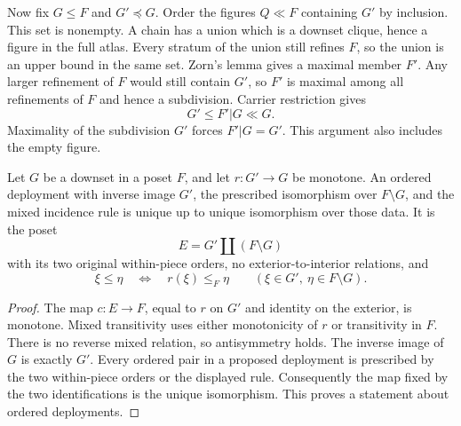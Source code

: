 Now fix $G\leq F$ and $G'\preceq G$.
Order the figures $Q\ll F$ containing $G'$ by inclusion.
This set is nonempty. A chain has a union which is a downset
clique, hence a figure in the full atlas. Every stratum of the
union still refines $F$, so the union is an upper bound in the
same set. Zorn's lemma gives a maximal member $F'$.
Any larger refinement of $F$ would still contain $G'$, so $F'$
is maximal among all refinements of $F$ and hence a subdivision.
Carrier restriction gives
\[
 G'\leq F'|G\ll G.
\]
Maximality of the subdivision $G'$ forces $F'|G=G'$.
This argument also includes the empty figure.

\begin{proposition}
\label{prop:deployment-uniqueness}
Let $G$ be a downset in a poset $F$, and let $r:G'\to G$
be monotone. An ordered deployment with inverse image $G'$,
the prescribed isomorphism over $F\setminus G$, and the mixed
incidence rule is unique up to unique isomorphism over those data.
It is the poset
\[
 E=G'\amalg(F\setminus G)
\]
with its two original within-piece orders, no exterior-to-interior
relations, and
\[
 \xi\leq\eta\quad\Longleftrightarrow\quad
 r(\xi)\leq_F\eta
 \qquad(\xi\in G',\ \eta\in F\setminus G).
\]
\end{proposition}
\begin{proof}
The map $c:E\to F$, equal to $r$ on $G'$ and identity on the
exterior, is monotone. Mixed transitivity uses either monotonicity
of $r$ or transitivity in $F$. There is no reverse mixed relation,
so antisymmetry holds. The inverse image of $G$ is exactly $G'$.
Every ordered pair in a proposed deployment is prescribed by the
two within-piece orders or the displayed rule. Consequently the
map fixed by the two identifications is the unique isomorphism.
This proves a statement about ordered deployments.
\end{proof}

